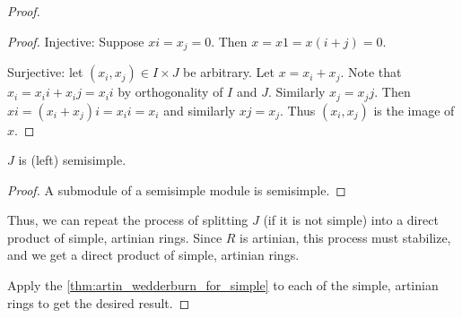 \begin{proof}
\begin{proof}
        Injective: Suppose $x i = x_j = 0$. Then $x = x 1 = x (i + j) = 0$.

        Surjective: let $(x_i, x_j)\in I \times J$ be arbitrary. Let $x = x_i + x_j$. Note that $x_i = x_i i + x_i j = x_i i$ by orthogonality of $I$ and $J$. Similarly $x_j = x_j j$. Then $x i = (x_i + x_j) i = x_i i = x_i$ and similarly $x j = x_j$. Thus $(x_i, x_j)$ is the image of $x$.
      \end{proof}

      \begin{claim}
        $J$ is (left) semisimple.
      \end{claim}
      \begin{proof}
        A submodule of a semisimple module is semisimple.
      \end{proof}

      Thus, we can repeat the process of splitting $J$ (if it is not simple) into a direct product of simple, artinian rings. Since $R$ is artinian, this process must stabilize, and we get a direct product of simple, artinian rings.
      
      Apply the \ref{thm:artin_wedderburn_for_simple} to each of the simple, artinian rings to get the desired result.
    \end{proof}
